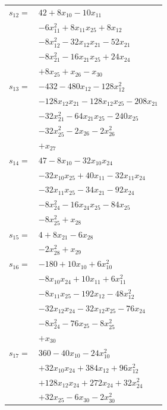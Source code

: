 \begin{longtable}{@{}r@{\;}l@{}}
\(s_{12}=\) & \(\displaystyle 42 +8x_{10} -10x_{11}\) \\
 & \(\displaystyle -6x_{11}^{2} +8x_{11}x_{25} +8x_{12}\) \\
 & \(\displaystyle -8x_{12}^{2} -32x_{12}x_{21} -52x_{21}\) \\
 & \(\displaystyle -8x_{21}^{2} -16x_{21}x_{25} +24x_{24}\) \\
 & \(\displaystyle +8x_{25} +x_{26} -x_{30}\) \\[3pt]
\(s_{13}=\) & \(\displaystyle -432 -480x_{12} -128x_{12}^{2}\) \\
 & \(\displaystyle -128x_{12}x_{21} -128x_{12}x_{25} -208x_{21}\) \\
 & \(\displaystyle -32x_{21}^{2} -64x_{21}x_{25} -240x_{25}\) \\
 & \(\displaystyle -32x_{25}^{2} -2x_{26} -2x_{26}^{2}\) \\
 & \(\displaystyle +x_{27}\) \\[3pt]
\(s_{14}=\) & \(\displaystyle 47 -8x_{10} -32x_{10}x_{24}\) \\
 & \(\displaystyle -32x_{10}x_{25} +40x_{11} -32x_{11}x_{24}\) \\
 & \(\displaystyle -32x_{11}x_{25} -34x_{21} -92x_{24}\) \\
 & \(\displaystyle -8x_{24}^{2} -16x_{24}x_{25} -84x_{25}\) \\
 & \(\displaystyle -8x_{25}^{2} +x_{28}\) \\[3pt]
\(s_{15}=\) & \(\displaystyle 4 +8x_{21} -6x_{28}\) \\
 & \(\displaystyle -2x_{28}^{2} +x_{29}\) \\[3pt]
\(s_{16}=\) & \(\displaystyle -180 +10x_{10} +6x_{10}^{2}\) \\
 & \(\displaystyle -8x_{10}x_{24} +10x_{11} +6x_{11}^{2}\) \\
 & \(\displaystyle -8x_{11}x_{25} -192x_{12} -48x_{12}^{2}\) \\
 & \(\displaystyle -32x_{12}x_{24} -32x_{12}x_{25} -76x_{24}\) \\
 & \(\displaystyle -8x_{24}^{2} -76x_{25} -8x_{25}^{2}\) \\
 & \(\displaystyle +x_{30}\) \\[3pt]
\(s_{17}=\) & \(\displaystyle 360 -40x_{10} -24x_{10}^{2}\) \\
 & \(\displaystyle +32x_{10}x_{24} +384x_{12} +96x_{12}^{2}\) \\
 & \(\displaystyle +128x_{12}x_{24} +272x_{24} +32x_{24}^{2}\) \\
 & \(\displaystyle +32x_{25} -6x_{30} -2x_{30}^{2}\) \\

\end{longtable}
